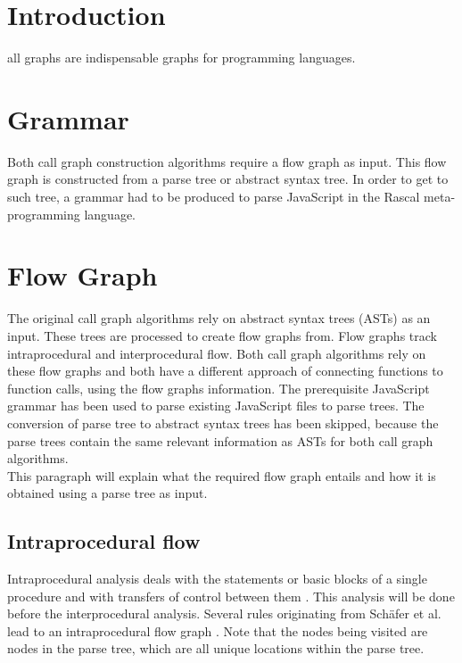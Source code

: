 \documentclass[journal,10pt]{IEEEtran} %
\begin{document}
\section{Introduction}
all graphs are indispensable graphs for programming languages.

\section{Grammar}
Both call graph construction algorithms require a flow graph as input. This flow graph is constructed from a parse tree or abstract syntax tree. In order to get to such tree, a grammar had to be produced to parse JavaScript in the Rascal meta-programming language.

\section{Flow Graph}
The original call graph algorithms rely on abstract syntax trees (ASTs) as an input. These trees are processed to create flow graphs from. Flow graphs track intraprocedural and interprocedural flow. Both call graph algorithms rely on these flow graphs and both have a different approach of connecting functions to function calls, using the flow graphs information. 
The prerequisite JavaScript grammar has been used to parse existing JavaScript files to parse trees. The conversion of parse tree to abstract syntax trees has been skipped, because the parse trees contain the same relevant information as ASTs for both call graph algorithms. \\
This paragraph will explain what the required flow graph entails and how it is obtained using a parse tree as input.

\subsection{Intraprocedural flow}
Intraprocedural analysis deals with the statements or basic blocks of a single procedure and with transfers of control between them \cite[p. 3]{Marlowe:1990aa}. This analysis will be done before the interprocedural analysis. Several rules originating from Sch\"{a}fer et al. lead to an intraprocedural flow graph \cite[p. 5]{Feldthaus:2013}. Note that the nodes being visited are nodes in the parse tree, which are all unique locations within the parse tree.
\end{document}
